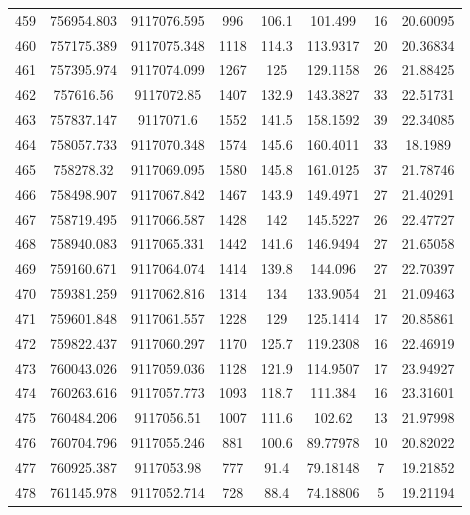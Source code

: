 \begin{longtable}{cccccccc}
459  & 756954.803      & 9117076.595      & 996     & 106.1 & 101.499  & 16 & 20.60095 \\
460  & 757175.389      & 9117075.348      & 1118    & 114.3 & 113.9317 & 20 & 20.36834 \\
461  & 757395.974      & 9117074.099      & 1267    & 125   & 129.1158 & 26 & 21.88425 \\
462  & 757616.56       & 9117072.85       & 1407    & 132.9 & 143.3827 & 33 & 22.51731 \\
463  & 757837.147      & 9117071.6        & 1552    & 141.5 & 158.1592 & 39 & 22.34085 \\
464  & 758057.733      & 9117070.348      & 1574    & 145.6 & 160.4011 & 33 & 18.1989  \\
465  & 758278.32       & 9117069.095      & 1580    & 145.8 & 161.0125 & 37 & 21.78746 \\
466  & 758498.907      & 9117067.842      & 1467    & 143.9 & 149.4971 & 27 & 21.40291 \\
467  & 758719.495      & 9117066.587      & 1428    & 142   & 145.5227 & 26 & 22.47727 \\
468  & 758940.083      & 9117065.331      & 1442    & 141.6 & 146.9494 & 27 & 21.65058 \\
469  & 759160.671      & 9117064.074      & 1414    & 139.8 & 144.096  & 27 & 22.70397 \\
470  & 759381.259      & 9117062.816      & 1314    & 134   & 133.9054 & 21 & 21.09463 \\
471  & 759601.848      & 9117061.557      & 1228    & 129   & 125.1414 & 17 & 20.85861 \\
472  & 759822.437      & 9117060.297      & 1170    & 125.7 & 119.2308 & 16 & 22.46919 \\
473  & 760043.026      & 9117059.036      & 1128    & 121.9 & 114.9507 & 17 & 23.94927 \\
474  & 760263.616      & 9117057.773      & 1093    & 118.7 & 111.384  & 16 & 23.31601 \\
475  & 760484.206      & 9117056.51       & 1007    & 111.6 & 102.62   & 13 & 21.97998 \\
476  & 760704.796      & 9117055.246      & 881     & 100.6 & 89.77978 & 10 & 20.82022 \\
477  & 760925.387      & 9117053.98       & 777     & 91.4  & 79.18148 & 7  & 19.21852 \\
478  & 761145.978      & 9117052.714      & 728     & 88.4  & 74.18806 & 5  & 19.21194 \\

\end{longtable}
